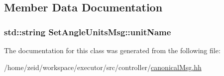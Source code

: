 \subsection{Member Data Documentation}
\hypertarget{class_set_angle_units_msg_a41b1dd23ecac9fbbf37d5abcd9cd8490}{
\subsubsection[{unitName}]{\setlength{\rightskip}{0pt plus 5cm}std::string {\bf SetAngleUnitsMsg::unitName}}}
\label{class_set_angle_units_msg_a41b1dd23ecac9fbbf37d5abcd9cd8490}


The documentation for this class was generated from the following file:\begin{DoxyCompactItemize}
\item 
/home/zeid/workspace/executor/src/controller/\hyperlink{canonical_msg_8hh}{canonicalMsg.hh}\end{DoxyCompactItemize}

